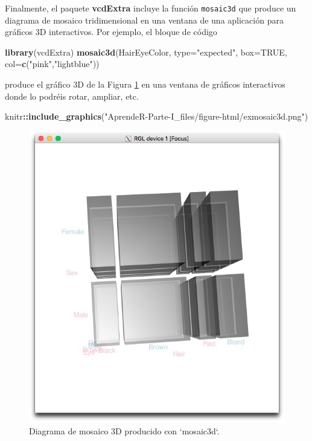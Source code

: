 \documentclass[]{book}
\newenvironment{Shaded}{\begin{snugshade}}{\end{snugshade}}
\newcommand{\DataTypeTok}[1]{\textcolor[rgb]{0.13,0.29,0.53}{#1}}
\newcommand{\KeywordTok}[1]{\textcolor[rgb]{0.13,0.29,0.53}{\textbf{#1}}}
\newcommand{\NormalTok}[1]{#1}
\newcommand{\OperatorTok}[1]{\textcolor[rgb]{0.81,0.36,0.00}{\textbf{#1}}}
\newcommand{\OtherTok}[1]{\textcolor[rgb]{0.56,0.35,0.01}{#1}}
\newcommand{\StringTok}[1]{\textcolor[rgb]{0.31,0.60,0.02}{#1}}
\theoremstyle{definition}
\theoremstyle{definition}
\theoremstyle{definition}
\theoremstyle{remark}
\begin{document}
Finalmente, el paquete \textbf{vcdExtra} incluye la función \texttt{mosaic3d} que produce un diagrama de mosaico tridimensional en una ventana de una aplicación para gráficos 3D interactivos. Por ejemplo, el bloque de código

\begin{Shaded}
\begin{Highlighting}[]
\KeywordTok{library}\NormalTok{(vcdExtra)}
\KeywordTok{mosaic3d}\NormalTok{(HairEyeColor, }\DataTypeTok{type=}\StringTok{"expected"}\NormalTok{, }\DataTypeTok{box=}\OtherTok{TRUE}\NormalTok{, }\DataTypeTok{col=}\KeywordTok{c}\NormalTok{(}\StringTok{"pink"}\NormalTok{,}\StringTok{"lightblue"}\NormalTok{))}
\end{Highlighting}
\end{Shaded}

produce el gráfico 3D de la Figura \ref{fig:extresqualb} en una ventana de gráficos interactivos donde lo podréis rotar, ampliar, etc.

\begin{Shaded}
\begin{Highlighting}[]
\NormalTok{knitr}\OperatorTok{::}\KeywordTok{include_graphics}\NormalTok{(}\StringTok{"AprendeR-Parte-I_files/figure-html/exmosaic3d.png"}\NormalTok{)}
\end{Highlighting}
\end{Shaded}

\begin{figure}

{\centering \includegraphics{AprendeR-Parte-I_files/figure-html/exmosaic3d} 

}

\caption{Diagrama de mosaico 3D producido con `mosaic3d`.}\label{fig:extresqualb}
\end{figure}
\end{document}
